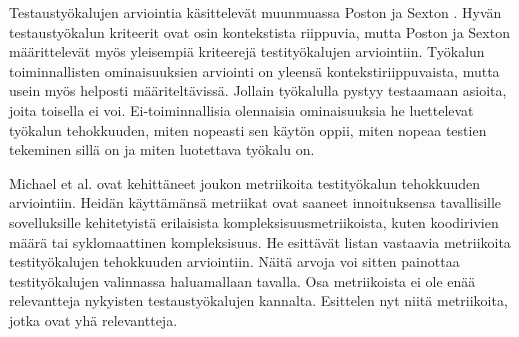Testaustyökalujen arviointia käsittelevät muunmuassa Poston ja Sexton \cite{poston92}. Hyvän testaustyökalun kriteerit ovat osin kontekstista riippuvia, mutta Poston ja Sexton määrittelevät myös yleisempiä kriteerejä testityökalujen arviointiin. Työkalun toiminnallisten ominaisuuksien arviointi on yleensä kontekstiriippuvaista, mutta usein myös helposti määriteltävissä. Jollain työkalulla pystyy testaamaan asioita, joita toisella ei voi. Ei-toiminnallisia olennaisia ominaisuuksia he luettelevat työkalun tehokkuuden, miten nopeasti sen käytön oppii, miten nopeaa testien tekeminen sillä on ja miten luotettava työkalu on.

Michael et al. \cite{michael02} ovat kehittäneet joukon metriikoita testityökalun tehokkuuden arviointiin. Heidän käyttämänsä metriikat ovat saaneet innoituksensa tavallisille sovelluksille kehitetyistä erilaisista kompleksisuusmetriikoista, kuten koodirivien määrä tai syklomaattinen kompleksisuus. He esittävät listan vastaavia metriikoita testityökalujen tehokkuuden arviointiin. Näitä arvoja voi sitten painottaa testityökalujen valinnassa haluamallaan tavalla. Osa metriikoista ei ole enää relevantteja nykyisten testaustyökalujen kannalta. Esittelen nyt niitä metriikoita, jotka ovat yhä relevantteja.

